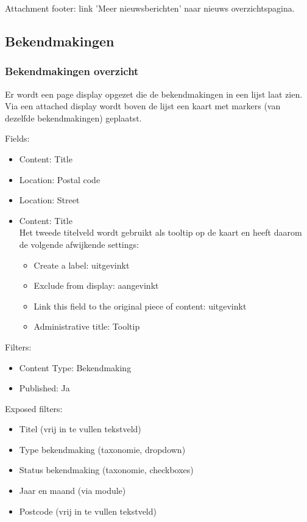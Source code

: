 Attachment footer: link 'Meer nieuwsberichten' naar nieuws overzichtspagina.

\subsection{Bekendmakingen}\label{bekendmakingenview}
\subsubsection{Bekendmakingen overzicht}\label{bekendmakingen-overzicht}

Er wordt een page display opgezet die de bekendmakingen in een lijst laat zien. Via een attached display wordt boven de lijst een kaart met  markers (van dezelfde bekendmakingen) geplaatst.

Fields:
\begin{itemize}
\item Content: Title
\item Location: Postal code
\item Location: Street
\item Content: Title \\
Het tweede titelveld wordt gebruikt als tooltip op de kaart en heeft daarom de volgende afwijkende settings:
\begin{itemize}
\item Create a label: uitgevinkt
\item Exclude from display: aangevinkt
\item Link this field to the original piece of content: uitgevinkt
\item Administrative title: Tooltip
\end{itemize}
\end{itemize}

Filters:
\begin{itemize}
\item Content Type: Bekendmaking
\item Published: Ja
\end{itemize}

Exposed filters:
\begin{itemize}
\item Titel (vrij in te vullen tekstveld)
\item Type bekendmaking (taxonomie, dropdown)
\item Status bekendmaking (taxonomie, checkboxes)
\item Jaar en maand (via  module)
\item Postcode (vrij in te vullen tekstveld)
\end{itemize}

